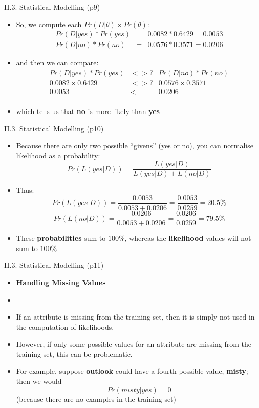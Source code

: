 \documentclass[handout]{beamer}
\newcommand{\strong}[1]{\textbf{\color{teal} #1}}
\begin{document}
\begin{frame}{II.3. Statistical Modelling (p9)}
\begin{itemize}
\item[] So, we compute each $Pr(D|\theta) \times Pr(\theta)$:
\begin{eqnarray*}
Pr(D|yes) * Pr(yes) & = & 0.0082 * 0.6429 = 0.0053 \\
Pr(D|no)  * Pr(no)  & = & 0.0576 * 0.3571 = 0.0206
\end{eqnarray*}
\item and then we can compare:
\begin{eqnarray*}
Pr(D|yes) * Pr(yes) & <>? & Pr(D|no) * Pr(no) \\
0.0082 \times 0.6429      & <>? & 0.0576 \times 0.3571 \\
0.0053                    & <   & 0.0206 \\
\end{eqnarray*}
\item which tells us that \textbf{no} is more likely than \textbf{yes}
\end{itemize}
\end{frame}
\begin{frame}{II.3. Statistical Modelling (p10)}
\begin{itemize}
\item Because there are only two possible ``givens'' (yes or no), you can normalise likelihood as a probability:
\[
Pr(L(yes|D)) = \frac{L(yes|D)}{L(yes|D) + L(no|D)}
\]
\item Thus:
\[
Pr(L(yes|D)) = \frac{0.0053}{0.0053+0.0206} = \frac{0.0053}{0.0259} = 20.5\%
\]
\[
Pr(L(no|D)) = \frac{0.0206}{0.0053+0.0206} = \frac{0.0206}{0.0259} = 79.5\%
\]
\item These \textbf{probabilities} sum to $100\%$, whereas the \textbf{likelihood} values will not sum to $100\%$
\end{itemize}
\end{frame}
\begin{frame}{II.3. Statistical Modelling (p11)}
\begin{itemize}
\item[] \strong{Handling Missing Values}
\item[]
\item If an attribute is missing from the training set, then it is simply not used in the computation of likelihoods.
\item However, if only some possible values for an attribute are missing from the training set, this can be problematic.
\item For example, suppose \textbf{outlook} could have a fourth possible value, \textbf{misty};
then we would
\[
	Pr(misty|yes)=0
\]
(because there are no examples in the training set)\\
\end{itemize}
\end{frame}
\end{document}
